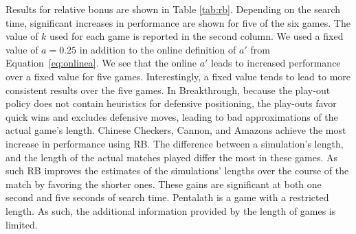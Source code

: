 \documentclass{ecai2014}
\begin{document}
\begin{table}
{\caption{Relative Bonus enabled using different search times, 5000 games} \label{tab:rb}}
\centering
\tabcolsep=0.15cm
\end{table}

Results for relative bonus are shown in Table \ref{tab:rb}. Depending on the search time, significant increases in performance are shown for five of the six games. The value of $k$ used for each game is reported in the second column. We used a fixed value of $a = 0.25$ in addition to the online definition of $a'$ from Equation~\ref{eq:onlinea}. We see that the online $a'$ leads to increased performance over a fixed value for five games. Interestingly, a fixed value tends to lead to more consistent results over the five games. In Breakthrough, because the play-out policy does not contain heuristics for defensive positioning, the play-outs favor quick wins and excludes defensive moves, leading to bad approximations of the actual game's length. Chinese Checkers, Cannon, and Amazons achieve the most increase in performance using RB. The difference between a simulation's length, and the length of the actual matches played differ the most in these games. As such RB improves the estimates of the simulations' lengths over the course of the match by favoring the shorter ones. These gains are significant at both one second and five seconds of search time. Pentalath is a game with a restricted length. As such, the additional information provided by the length of games is limited. 
\end{document}
